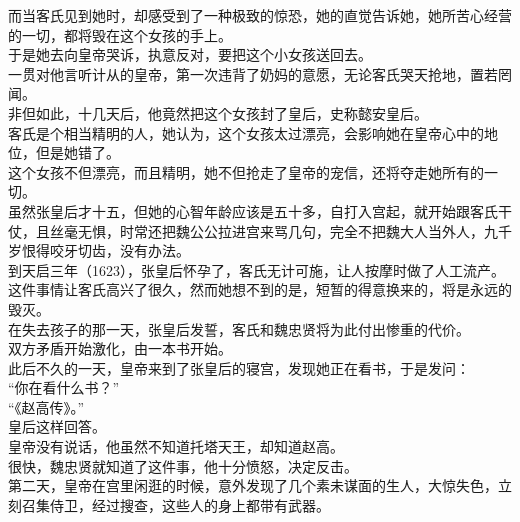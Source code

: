 \begin{multicols}{\theparacolNo}
而当客氏见到她时，却感受到了一种极致的惊恐，她的直觉告诉她，她所苦心经营的一切，都将毁在这个女孩的手上。\\

于是她去向皇帝哭诉，执意反对，要把这个小女孩送回去。\\

一贯对他言听计从的皇帝，第一次违背了奶妈的意愿，无论客氏哭天抢地，置若罔闻。\\

非但如此，十几天后，他竟然把这个女孩封了皇后，史称懿安皇后。\\

客氏是个相当精明的人，她认为，这个女孩太过漂亮，会影响她在皇帝心中的地位，但是她错了。\\

这个女孩不但漂亮，而且精明，她不但抢走了皇帝的宠信，还将夺走她所有的一切。\\

虽然张皇后才十五，但她的心智年龄应该是五十多，自打入宫起，就开始跟客氏干仗，且丝毫无惧，时常还把魏公公拉进宫来骂几句，完全不把魏大人当外人，九千岁恨得咬牙切齿，没有办法。\\

到天启三年（1623），张皇后怀孕了，客氏无计可施，让人按摩时做了人工流产。\\

这件事情让客氏高兴了很久，然而她想不到的是，短暂的得意换来的，将是永远的毁灭。\\

在失去孩子的那一天，张皇后发誓，客氏和魏忠贤将为此付出惨重的代价。\\

双方矛盾开始激化，由一本书开始。\\

此后不久的一天，皇帝来到了张皇后的寝宫，发现她正在看书，于是发问：\\

“你在看什么书？”\\

“《赵高传》。”\\

皇后这样回答。\\

皇帝没有说话，他虽然不知道托塔天王，却知道赵高。\\

很快，魏忠贤就知道了这件事，他十分愤怒，决定反击。\\

第二天，皇帝在宫里闲逛的时候，意外发现了几个素未谋面的生人，大惊失色，立刻召集侍卫，经过搜查，这些人的身上都带有武器。\\


\end{multicols}
